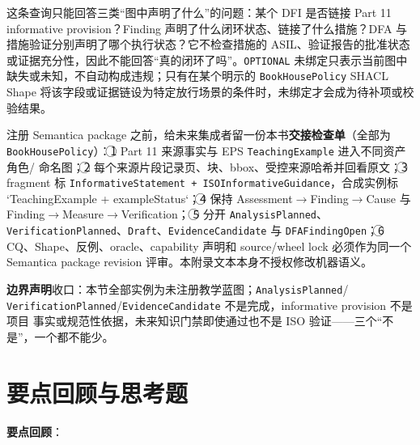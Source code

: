这条查询只能回答三类“图中声明了什么”的问题：某个 DFI 是否链接 Part 11 informative provision？Finding 声明了什么闭环状态、链接了什么措施？DFA 与措施验证分别声明了哪个执行状态？它不检查措施的 ASIL、验证报告的批准状态或证据充分性，因此不能回答“真的闭环了吗”。\nolinkurl{OPTIONAL} 未绑定只表示当前图中缺失或未知，不自动构成违规；只有在某个明示的 \nolinkurl{BookHousePolicy} SHACL Shape 将该字段或证据链设为特定放行场景的条件时，未绑定才会成为待补项或校验结果。

注册 Semantica package 之前，给未来集成者留一份本书\textbf{交接检查单}（全部为
\nolinkurl{BookHousePolicy}）：\textcircled{\scriptsize 1} Part 11 来源事实与 EPS \nolinkurl{TeachingExample} 进入不同资产角色/
命名图；\textcircled{\scriptsize 2} 每个来源片段记录页、块、bbox、受控来源哈希并回看原文；\textcircled{\scriptsize 3} fragment 标
\allowbreak{}\texttt{Informative\allowbreak{}Statement \allowbreak{}+\allowbreak{} \allowbreak{}ISOInformative\allowbreak{}Guidance}\allowbreak{}，合成实例标 `TeachingExample +
exampleStatus`；\textcircled{\scriptsize 4} 保持 Assessment\(\rightarrow\)Finding\(\rightarrow\)Cause 与 Finding\(\rightarrow\)Measure\(\rightarrow\)Verification；
\textcircled{\scriptsize 5} 分开 \nolinkurl{AnalysisPlanned}、\nolinkurl{VerificationPlanned}、\nolinkurl{Draft}、\nolinkurl{EvidenceCandidate} 与
\nolinkurl{DFAFindingOpen}；\textcircled{\scriptsize 6} CQ、Shape、反例、oracle、capability 声明和 source/wheel lock
必须作为同一个 Semantica package revision 评审。本附录文本本身不授权修改机器语义。

\textbf{边界声明}收口：本节全部实例为未注册教学蓝图；\nolinkurl{AnalysisPlanned}/
\nolinkurl{VerificationPlanned}/\nolinkurl{EvidenceCandidate} 不是完成，informative provision 不是项目
事实或规范性依据，未来知识门禁即使通过也不是 ISO 验证——三个“不是”，一个都不能少。

\section{要点回顾与思考题}

\textbf{要点回顾}：

